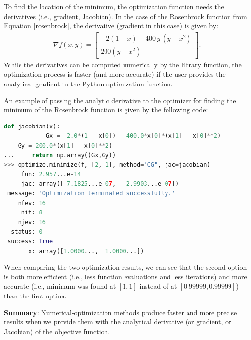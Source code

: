 \documentclass[12pt,letter]{article}
\begin{document}
To find the location of the minimum, the optimization function needs the derivatives (i.e., gradient, Jacobian). In the case of the Rosenbrock function from Equation \ref{rosenbrock}, the derivative (gradient in this case) is given by:
\begin{align}
\nabla f(x,y) = 
\begin{bmatrix}
-2(1-x) - 400\,y\,(y-x^2)\\
200(y - x^2)
\end{bmatrix}.
\end{align}
While the derivatives can be computed numerically by the library function, the optimization process is faster (and more accurate) if the user provides the analytical gradient to the Python optimization function. 

An example of passing the analytic derivative to the optimizer for finding the minimum of the Rosenbrock function is given by the following code:

\begin{lstlisting}[language=Python]
def jacobian(x):
        	Gx = -2.0*(1 - x[0]) - 400.0*x[0]*(x[1] - x[0]**2)
	Gy = 200.0*(x[1] - x[0]**2)       
...     return np.array((Gx,Gy))
>>> optimize.minimize(f, [2, 1], method="CG", jac=jacobian)    
     fun: 2.957...e-14
     jac: array([ 7.1825...e-07,  -2.9903...e-07])
 message: 'Optimization terminated successfully.'
    nfev: 16
     nit: 8
    njev: 16
  status: 0
 success: True
       x: array([1.0000...,  1.0000...])
\end{lstlisting}
When comparing the two optimization results, we can see that the second option is both more efficient (i.e., less function evaluations and less iterations) and more accurate (i.e., minimum was found at $[1,1]$ instead of at $[0.99999,0.99999]$) than the first option.\\

    \begin{mdframed}[backgroundcolor=green!20] 
        {\bf Summary}: Numerical-optimization methods produce faster and more precise results when we provide them with the analytical derivative (or gradient, or Jacobian) of the objective function. 
    \end{mdframed}

 

\end{document}
